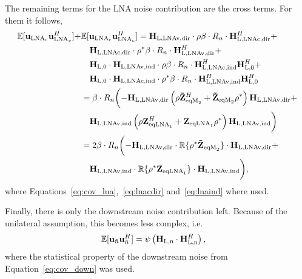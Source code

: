 The remaining terms for the LNA noise contribution are the cross terms.
For them it follows,
\begin{align}
\nonumber
\mathbb{E}[\mathbf{u}_{\text{LNA}_c}\mathbf{u}_{\text{LNA}_v}^H] +&
\mathbb{E}[\mathbf{u}_{\text{LNA}_c}\mathbf{u}_{\text{LNA}_c}^H] = 
	\mathbf{H}_\text{L,LNAv,dir} 
	\cdot\rho\beta \cdot R_n \cdot
	\mathbf{H}_\text{L,LNAc,dir}^H +\\\nonumber
&\quad	\mathbf{H}_\text{L,LNAc,dir} 
	\cdot\rho^*\beta \cdot R_n \cdot
	\mathbf{H}_\text{L,LNAv,dir}^H +\\\nonumber
&\quad	\mathbf{H}_\text{L,0}\cdot\mathbf{H}_\text{L,LNAv,ind} 
	\cdot\rho\beta \cdot R_n \cdot
	\mathbf{H}_\text{L,LNAc,ind}^H\mathbf{H}_\text{L,0}^H + \\\nonumber
&\quad	\mathbf{H}_\text{L,0}\cdot\mathbf{H}_\text{L,LNAc,ind} 
	\cdot\rho^*\beta \cdot R_n \cdot
	\mathbf{H}_\text{L,LNAv,ind}^H\mathbf{H}_\text{L,0}^H\\\nonumber
&= \beta \cdot R_n\biggl(
	-\mathbf{H}_\text{L,LNAv,dir} \left(\rho\mathbf{\tilde{Z}}_{\text{eqM}_2}^H+
	\mathbf{\tilde{Z}}_{\text{eqM}_2}\rho^*\right) \mathbf{H}_\text{L,LNAv,dir}+\\\nonumber
&\quad	\mathbf{H}_\text{L,LNAv,ind} \left(\rho\mathbf{Z}_{\text{eqLNA}_1}^H+
	\mathbf{Z}_{\text{eqLNA}_1}\rho^*\right) \mathbf{H}_\text{L,LNAv,ind}\biggr)\\\nonumber
&= 2\beta \cdot R_n\biggl(
	-\mathbf{H}_\text{L,LNAv,dir} \cdot\mathbb{R}\{\rho^*\mathbf{\tilde{Z}}_{\text{eqM}_2}\}\cdot
	\mathbf{H}_\text{L,LNAv,dir}+\\
&\quad	\mathbf{H}_\text{L,LNAv,ind} \cdot\mathbb{R}\{\rho^*\mathbf{Z}_{\text{eqLNA}_1}\}\cdot
	\mathbf{H}_\text{L,LNAv,ind}\biggr),
\end{align}
where Equations~\eqref{eq:cov_lna},~\eqref{eq:lnacdir} and~\eqref{eq:lnaind} where used.

Finally, there is only the downstream noise contribution left.
Because of the unilateral assumption, this becomes less complex, i.e.
\begin{align}
\nonumber
\mathbb{E}[\mathbf{u}_{\tilde{n}}\mathbf{u}_{\tilde{n}}^H]&=
\psi\left(\mathbf{H}_\text{L,n}\cdot\mathbf{H}_\text{L,n}^H\right),
\end{align}
where the statistical property of the downstream noise from Equation~\eqref{eq:cov_down} was used.


